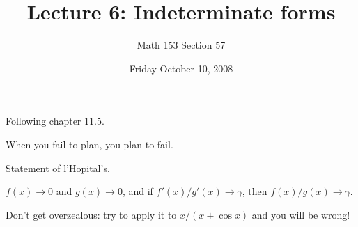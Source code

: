 \documentclass[12pt]{article}
\title{Lecture 6: Indeterminate forms}
\author{Math 153 Section 57}
\date{Friday October 10, 2008}
\begin{document}
\maketitle

Following chapter 11.5.

When you fail to plan, you plan to fail.

Statement of l'Hopital's.

$f(x) \to 0$ and $g(x) \to 0$, and if $f'(x)/g'(x) \to \gamma$, then $f(x)/g(x) \to \gamma$.

Don't get overzealous: try to apply it to $x/(x+\cos x)$ and you will be wrong!
\end{document}
